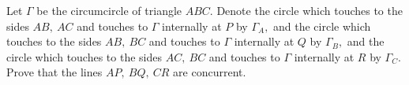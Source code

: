 Let $\Gamma$ be the circumcircle of triangle $ABC.$ Denote the circle which touches to the sides $AB, \ AC$ and touches to $\Gamma$ internally at $P$ by $\Gamma_{A},$ and the circle which touches to the sides $AB, \ BC$ and touches to $\Gamma$ internally at $Q$ by $\Gamma_{B},$ and the circle which touches to the sides $AC, \ BC$ and touches to $\Gamma$ internally at $R$ by $\Gamma_{C}.$ Prove that the lines $AP,\ BQ,\ CR$ are concurrent.